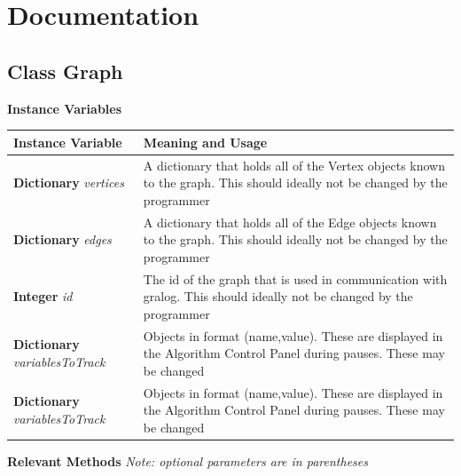 \documentclass{article}
\newlength\q
\begin{document}
\section{Documentation}

\subsection{Class Graph}

\textbf{{\large Instance Variables}}

\begin{table}[h]
\begin{tabular}{p{\q}p{\q}}
Instance Variable & Meaning and Usage \\ \hline
\textbf{Dictionary} \textit{vertices} & A dictionary that holds all of the Vertex objects known to the graph. This should ideally not be changed by the programmer \\\hline
\textbf{Dictionary} \textit{edges} & A dictionary that holds all of the Edge objects known to the graph. This should ideally not be changed by the programmer \\\hline
\textbf{Integer} \textit{id} & The id of the graph that is used in communication with gralog. This should ideally not be changed by the programmer \\ \hline
\textbf{Dictionary} \textit{variablesToTrack} & Objects in format (name,value). These are displayed in the Algorithm Control Panel during pauses. These may be changed \\ \hline
\textbf{Dictionary} \textit{variablesToTrack} & Objects in format (name,value). These are displayed in the Algorithm Control Panel during pauses. These may be changed \\ \hline
\end{tabular}
\end{table}

\textbf{{\large Relevant Methods}}
\textit{Note: optional parameters are in parentheses}
\end{document}
